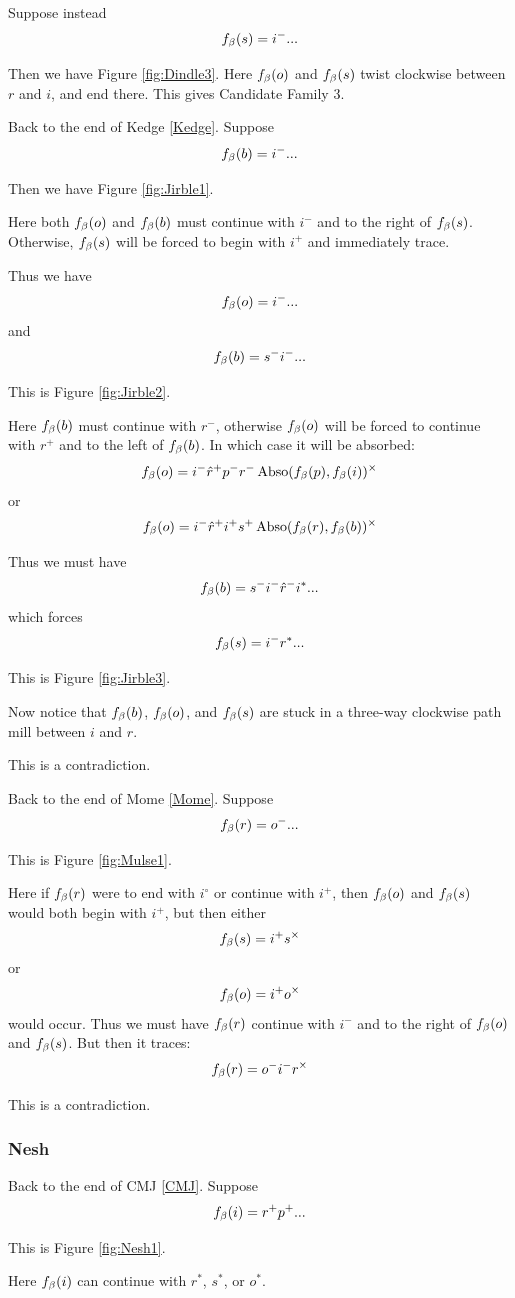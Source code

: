 Suppose instead
$$f_\beta(s) = i^-...$$

Then we have Figure \ref{fig:Dindle3}. Here $f_\beta(o)$ and $f_\beta(s)$ twist clockwise between $r$ and $i$, and end there. This gives Candidate Family 3.

Back to the end of Kedge \ref{Kedge}. Suppose
$$f_\beta(b) = i^-...$$

Then we have Figure \ref{fig:Jirble1}.

Here both $f_\beta(o)$ and $f_\beta(b)$ must continue with $i^-$ and to the right of $f_\beta(s)$. Otherwise, $f_\beta(s)$ will be forced to begin with $i^+$ and immediately trace.

Thus we have
$$f_\beta(o) = i^-...$$
and 
$$f_\beta(b) = s^- i^-...$$

This is Figure \ref{fig:Jirble2}.

Here $f_\beta(b)$ must continue with $r^-$, otherwise $f_\beta(o)$ will be forced to continue with $r^+$ and to the left of $f_\beta(b)$. In which case it will be absorbed:
$$f_\beta(o) = i^- \hat{r}^+ p^- r^- \operatorname{Abso}(f_\beta(p), f_\beta(i))^\times$$
or
$$f_\beta(o) = i^- \hat{r}^+ i^+ s^+ \operatorname{Abso}(f_\beta(r), f_\beta(b))^\times$$

Thus we must have
$$f_\beta(b) = s^- i^- \hat{r}^- i^*...$$
which forces
$$f_\beta(s) = i^- r^*...$$

This is Figure \ref{fig:Jirble3}.

Now notice that $f_\beta(b)$, $f_\beta(o)$, and $f_\beta(s)$ are stuck in a three-way clockwise path mill between $i$ and $r$.

This is a contradiction.


Back to the end of Mome \ref{Mome}. Suppose
$$f_\beta(r) = o^-...$$

This is Figure \ref{fig:Mulse1}.

Here if $f_\beta(r)$ were to end with $i^\circ$ or continue with $i^+$, then $f_\beta(o)$ and $f_\beta(s)$ would both begin with $i^+$, but then either
$$f_\beta(s) = i^+ s^\times$$
or
$$f_\beta(o) = i^+ o^\times$$
would occur. Thus we must have $f_\beta(r)$ continue with $i^-$ and to the right of $f_\beta(o)$ and $f_\beta(s)$. But then it traces:
$$f_\beta(r) = o^- i^- r^\times$$

This is a contradiction.

\subsubsection{Nesh}\label{Nesh}
Back to the end of CMJ \ref{CMJ}. Suppose
$$f_\beta(i) = r^+ p^+...$$

This is Figure \ref{fig:Nesh1}.

Here $f_\beta(i)$ can continue with $r^*$, $s^*$, or $o^*$.

